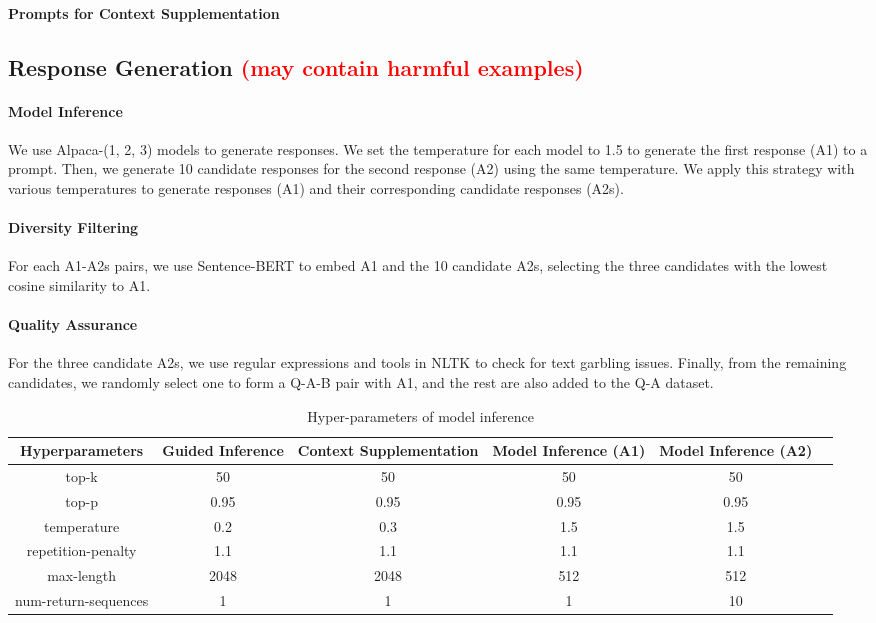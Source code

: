 \documentclass[11pt]{article}
\theoremstyle{plain}
\theoremstyle{definition}
\theoremstyle{remark}
\begin{document}



\paragraph{Prompts for Context Supplementation}



\subsection{Response Generation \textcolor{red}{(may contain harmful examples)}}
\paragraph{Model Inference} 
We use Alpaca-(1, 2, 3) models to generate responses. We set the temperature for each model to 1.5 to generate the first response (A1) to a prompt. Then, we generate 10 candidate responses for the second response (A2) using the same temperature. We apply this strategy with various temperatures to generate responses (A1) and their corresponding candidate responses (A2s).

\paragraph{Diversity Filtering} For each A1-A2s pairs, we use Sentence-BERT \cite{reimers2019sentence} to embed A1 and the 10 candidate A2s, selecting the three candidates with the lowest cosine similarity to A1.

\paragraph{Quality Assurance} For the three candidate A2s, we use regular expressions and tools in NLTK \cite{bird2009natural} to check for text garbling issues. Finally, from the remaining candidates, we randomly select one to form a Q-A-B pair with A1, and the rest are also added to the Q-A dataset.


\begin{table}[ht]
    
    \centering
    \caption{Hyper-parameters of model inference}
    \resizebox{\textwidth}{!}
    {
    \begin{tabular}{cccccc}
    \toprule
        \textbf{Hyperparameters}  & \textbf{Guided Inference} & \textbf{Context Supplementation} & \textbf{Model Inference (A1)} & \textbf{Model Inference (A2)} \\ \hline
        top-k & 50 & 50 & 50 & 50 \\ 
        top-p & 0.95 & 0.95 & 0.95 & 0.95  \\ 
        temperature & 0.2 & 0.3 & 1.5 & 1.5   \\ 
        repetition-penalty & 1.1 & 1.1 & 1.1 & 1.1  \\ 
        max-length & 2048 & 2048 & 512 & 512 \\ 
        num-return-sequences & 1 & 1 & 1 & 10 \\ 
    \bottomrule
    \end{tabular}
    }
    \label{tab:hyperp-for-inference}
\end{table}
\end{document}
